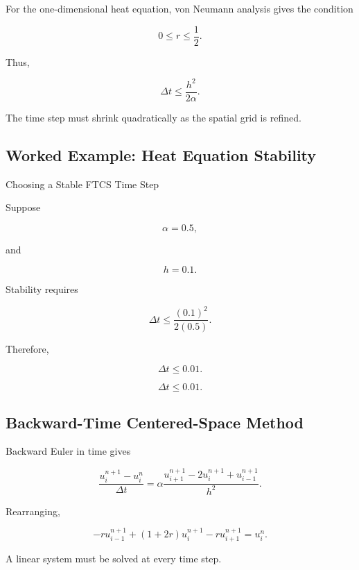 For the one-dimensional heat equation, von Neumann analysis gives the
condition

\[
\boxed{
0\leq r\leq\frac12.
}
\]

Thus,

\[
\boxed{
\Delta t
\leq
\frac{
h^2
}{
2\alpha
}.
}
\]

The time step must shrink quadratically as the spatial grid is refined.

\subsection{Worked Example: Heat Equation Stability}
\label{subsec:worked-heat-stability}

\begin{workedexamplebox}{Choosing a Stable FTCS Time Step}

Suppose

\[
\alpha=0.5,
\]

and

\[
h=0.1.
\]

Stability requires

\[
\Delta t
\leq
\frac{
(0.1)^2
}{
2(0.5)
}.
\]

Therefore,

\[
\Delta t
\leq
0.01.
\]

\begin{answerbox}
\[
\boxed{
\Delta t\leq0.01.
}
\]
\end{answerbox}

\end{workedexamplebox}

\subsection{Backward-Time Centered-Space Method}
\label{subsec:btcs-heat}

Backward Euler in time gives

\[
\boxed{
\frac{
u_i^{n+1}-u_i^n
}{
\Delta t
}
=
\alpha
\frac{
u_{i+1}^{n+1}
-
2u_i^{n+1}
+
u_{i-1}^{n+1}
}{
h^2
}.
}
\]

Rearranging,

\[
\boxed{
-r u_{i-1}^{n+1}
+
(1+2r)u_i^{n+1}
-
r u_{i+1}^{n+1}
=
u_i^n.
}
\]

A linear system must be solved at every time step.


